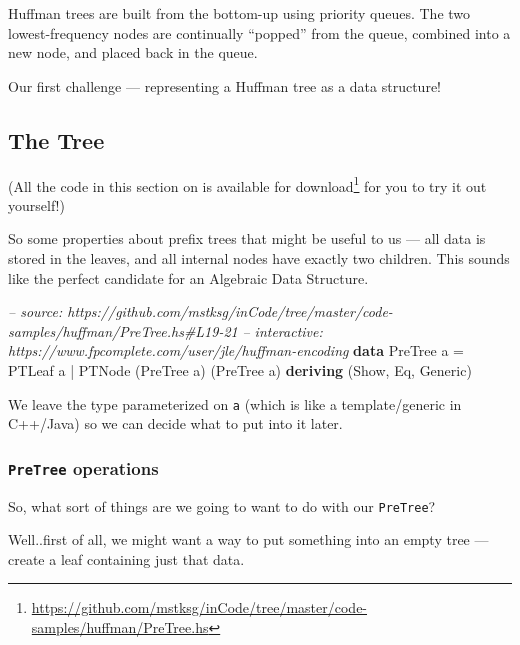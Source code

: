 \documentclass[]{article}
\newenvironment{Shaded}{}{}
\newcommand{\KeywordTok}[1]{\textcolor[rgb]{0.00,0.44,0.13}{\textbf{{#1}}}}
\newcommand{\DataTypeTok}[1]{\textcolor[rgb]{0.56,0.13,0.00}{{#1}}}
\newcommand{\CommentTok}[1]{\textcolor[rgb]{0.38,0.63,0.69}{\textit{{#1}}}}
\newcommand{\FunctionTok}[1]{\textcolor[rgb]{0.02,0.16,0.49}{{#1}}}
\newcommand{\NormalTok}[1]{{#1}}
\renewcommand{\href}[2]{#2\footnote{\url{#1}}}
\begin{document}
Huffman trees are built from the bottom-up using priority queues. The
two lowest-frequency nodes are continually ``popped'' from the queue,
combined into a new node, and placed back in the queue.

Our first challenge --- representing a Huffman tree as a data structure!

\subsection{The Tree}\label{the-tree}

(All the code in this section on is
\href{https://github.com/mstksg/inCode/tree/master/code-samples/huffman/PreTree.hs}{available
for download} for you to try it out yourself!)

So some properties about prefix trees that might be useful to us --- all
data is stored in the leaves, and all internal nodes have exactly two
children. This sounds like the perfect candidate for an Algebraic Data
Structure.

\begin{Shaded}
\begin{Highlighting}[]
\CommentTok{-- source: https://github.com/mstksg/inCode/tree/master/code-samples/huffman/PreTree.hs#L19-21}
\CommentTok{-- interactive: https://www.fpcomplete.com/user/jle/huffman-encoding}
\KeywordTok{data} \DataTypeTok{PreTree} \NormalTok{a }\FunctionTok{=} \DataTypeTok{PTLeaf} \NormalTok{a}
               \FunctionTok{|} \DataTypeTok{PTNode} \NormalTok{(}\DataTypeTok{PreTree} \NormalTok{a) (}\DataTypeTok{PreTree} \NormalTok{a)}
               \KeywordTok{deriving} \NormalTok{(}\DataTypeTok{Show}\NormalTok{, }\DataTypeTok{Eq}\NormalTok{, }\DataTypeTok{Generic}\NormalTok{)}
\end{Highlighting}
\end{Shaded}

We leave the type parameterized on \texttt{a} (which is like a
template/generic in C++/Java) so we can decide what to put into it
later.

\subsubsection{\texorpdfstring{\texttt{PreTree}
operations}{PreTree operations}}\label{pretree-operations}

So, what sort of things are we going to want to do with our
\texttt{PreTree}?

Well..first of all, we might want a way to put something into an empty
tree --- create a leaf containing just that data.
\end{document}
